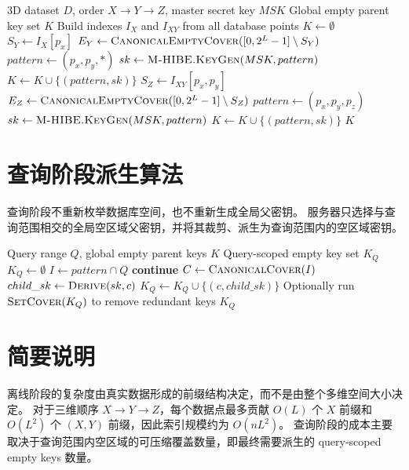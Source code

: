 \documentclass[11pt,a4paper]{ctexart}
\begin{document}
\begin{algorithm}[H]
\caption{3D Empty Parent Key Generation}
\begin{algorithmic}[1]
\Require 3D dataset $D$, order $X \rightarrow Y \rightarrow Z$, master secret key $MSK$
\Ensure Global empty parent key set $K$
\State Build indexes $I_X$ and $I_{XY}$ from all database points
\State $K \gets \emptyset$
  \State $S_Y \gets I_X[p_x]$
  \State $E_Y \gets \textsc{CanonicalEmptyCover}([0,2^L-1] \setminus S_Y)$
    \State $pattern \gets (p_x, p_y, *)$
    \State $sk \gets \textsc{M-HIBE.KeyGen}(MSK, pattern)$
    \State $K \gets K \cup \{(pattern, sk)\}$
  \EndFor
\EndFor
{}
  \State $S_Z \gets I_{XY}[p_x,p_y]$
  \State $E_Z \gets \textsc{CanonicalEmptyCover}([0,2^L-1] \setminus S_Z)$
    \State $pattern \gets (p_x, p_y, p_z)$
    \State $sk \gets \textsc{M-HIBE.KeyGen}(MSK, pattern)$
    \State $K \gets K \cup \{(pattern, sk)\}$
  \EndFor
\EndFor
\State \Return $K$
\end{algorithmic}
\end{algorithm}

\section{查询阶段派生算法}

查询阶段不重新枚举数据库空间，也不重新生成全局父密钥。
服务器只选择与查询范围相交的全局空区域父密钥，并将其裁剪、派生为查询范围内的空区域密钥。

\begin{algorithm}[H]
\caption{Query-Scoped Empty Key Derivation}
\begin{algorithmic}[1]
\Require Query range $Q$, global empty parent keys $K$
\Ensure Query-scoped empty key set $K_Q$
\State $K_Q \gets \emptyset$
  \State $I \gets pattern \cap Q$
    \State \textbf{continue}
  \EndIf
  \State $C \gets \textsc{CanonicalCover}(I)$
    \State $child\_sk \gets \textsc{Derive}(sk,c)$
    \State $K_Q \gets K_Q \cup \{(c, child\_sk)\}$
  \EndFor
\EndFor
\State Optionally run $\textsc{SetCover}(K_Q)$ to remove redundant keys
\State \Return $K_Q$
\end{algorithmic}
\end{algorithm}

\section{简要说明}

离线阶段的复杂度由真实数据形成的前缀结构决定，而不是由整个多维空间大小决定。
对于三维顺序 $X \rightarrow Y \rightarrow Z$，每个数据点最多贡献 $O(L)$ 个 $X$ 前缀和 $O(L^2)$ 个 $(X,Y)$ 前缀，因此索引规模约为 $O(nL^2)$。
查询阶段的成本主要取决于查询范围内空区域的可压缩覆盖数量，即最终需要派生的 query-scoped empty keys 数量。
\end{document}
